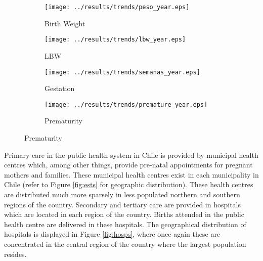 \documentclass[12pt]{article}
\begin{document}
\begin{spacing}{1.4}
\begin{figure}[htpb!]
  \begin{center}
    \caption{Longer Term Trends in Birth Outcomes in Chile}
    \label{trendlong}
    \begin{subfigure}{.5\textwidth}
      \centering
      \texttt{[image: ../results/trends/peso\_year.eps]}
      \caption{Birth Weight}
      \label{trendBW}
    \end{subfigure}%
    \begin{subfigure}{.5\textwidth}
      \centering
      \texttt{[image: ../results/trends/lbw\_year.eps]}
      \caption{LBW}
      \label{trendLBW}
    \end{subfigure}
    \begin{subfigure}{.5\textwidth}
      \centering
      \texttt{[image: ../results/trends/semanas\_year.eps]}
      \caption{Gestation}
      \label{trendGest}
    \end{subfigure}%
    \begin{subfigure}{.5\textwidth}
      \centering
      \texttt{[image: ../results/trends/premature\_year.eps]}
      \caption{Prematurity}
      \label{trendPrem}
    \end{subfigure}
  \end{center}
\end{figure}

Primary care in the public health system in Chile is provided by municipal
health centres which, among other things, provide pre-natal appointments
for pregnant mothers and families.  These municipal health centres exist
in each municipality in Chile (refer to Figure \ref{fig:ests} for geographic
distribution).  These health centres are distributed much more sparsely
in less populated northern and southern regions of the country.  Secondary
and tertiary care are provided in hospitals which are located in each
region of the country.  Births attended in the public health centre are
delivered in these hospitals.  The geographical distribution of hospitals
is displayed in Figure \ref{fig:hosps}, where once again these are
concentrated in the central region of the country where the largest population
resides.


\end{spacing}
\end{document}
